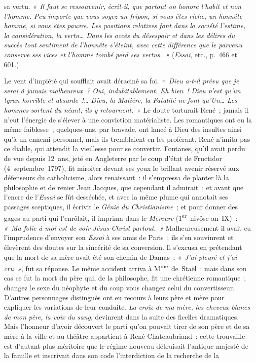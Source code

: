\documentclass[french,twoside]{book} %
\begin{document}
\label{p583}sa vertu. \emph{« Il faut se ressouvenir, écrit-il, que partout on honore l’habit et non l’homme. Peu importe que vous soyez un fripon, si vous êtes riche, un honnête homme, si vous êtes pauvre. Les positions relatives font dans la société l’estime, la considération, la vertu… Dans les accès du désespoir et dans les délires du succès tout sentiment de l’honnête s’éteint, avec cette différence que le parvenu conserve ses vices et l’homme tombé perd ses vertus. »} (\emph{Essai}, etc., p. 466 et 601.)\par
Le vent d’impiété qui soufflait avait déraciné sa foi. \emph{« Dieu a-t-il prévu que je serai à jamais malheureux ? Oui, indubitablement. Eh bien ! Dieu n’est qu’un tyran horrible et absurde !… Dieu, la Matière, la Fatalité ne font qu’Un… Les hommes sortent du néant, ils y retournent. »} Le doute torturait René ; jamais il n’eut l’énergie de s’élever à une conviction matérialiste. Les romantiques ont eu la même faiblesse ; quelques-uns, par bravade, ont lancé à Dieu des insultes ainsi qu’à un ennemi personnel, mais ils tremblaient en les proférant. René n’imita pas ce diable, qui attendit la vieillesse pour se convertir. Fontanes, qu’il avait perdu de vue depuis 12 ans, jeté en Angleterre par le coup d’état de Fructidor (4 septembre 1797), fit miroiter devant ses yeux le brillant avenir réservé aux défenseurs du catholicisme, alors renaissant : il s’empressa de planter là la philosophie et de renier Jean Jacques, que cependant il admirait ; et avant que l’encre de l’\emph{Essai} se fût desséchée, et avec la même plume qui annotait ses passages sceptiques, il écrivit le \emph{Génie du Christianisme} ; et pour donner des gages au parti qui l’enrôlait, il imprima dans le \emph{Mercure} (1\textsuperscript{er} nivôse an IX) : \emph{« Ma folie à moi est de voir Jésus-Christ partout. »} Malheureusement il avait eu l’imprudence d’envoyer son \emph{Essai} à ses amis de Paris ; ils s’en souvinrent et élevèrent des doutes sur la sincérité de sa conversion. Il s’excusa en prétendant que la mort de sa mère avait été son chemin de Damas : \emph{« J’ai pleuré et j’ai cru »}, fut sa réponse. Le même accident arriva à M\textsuperscript{me} de Staël : mais dans son cas ce fut la mort du père qui, de la philosophe, fit une chrétienne romantique ; changez le sexe du néophyte et du coup vous changez celui du convertisseur. D’autres personnages distingués ont eu recours à leurs père et mère pour expliquer les variations de leur conduite. {\itshape La croix de ma mère, les cheveux blancs de mon père, la voix du sang}, devinrent dans la suite des ficelles dramatiques. Mais l’honneur d’avoir découvert le parti qu’on pouvait tirer de son père et de sa mère à la ville et au théâtre appartient à René Chateaubriand : cette trouvaille est d’autant plus méritoire que le régime nouveau détruisait l’antique majesté de la famille et inscrivait dans son code l’interdiction de la recherche de la  
\end{document}
